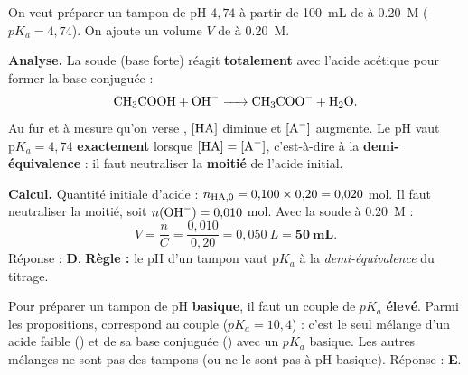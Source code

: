 \documentclass[11pt,a4paper]{article}
\begin{document}
\begin{exemple}
On veut préparer un tampon de pH $4{,}74$ à partir de \SI{100}{mL} de  à \SI{0,20}{M}
($pK_a = 4{,}74$). On ajoute un volume $V$ de  à \SI{0,20}{M}.

\smallskip
\textbf{Analyse.} La soude (base forte) réagit \textbf{totalement} avec l'acide acétique pour former la base
conjuguée  :
\[ \ce{CH3COOH + OH- -> CH3COO- + H2O}. \]
Au fur et à mesure qu'on verse , $[\ce{HA}]$ diminue et $[\ce{A-}]$ augmente. Le pH vaut
$\mathrm{p}K_a = 4{,}74$ \textbf{exactement} lorsque $[\ce{HA}] = [\ce{A-}]$, c'est-à-dire à la
\textbf{demi-équivalence} : il faut neutraliser la \textbf{moitié} de l'acide initial.

\textbf{Calcul.} Quantité initiale d'acide : $n_{\ce{HA},0} = 0{,}100 \times 0{,}20 = 0{,}020$ \si{mol}. Il
faut neutraliser la moitié, soit $n(\ce{OH-}) = 0{,}010$ \si{mol}. Avec la soude à \SI{0,20}{M} :
\[ V = \frac{n}{C} = \frac{0{,}010}{0{,}20} = 0{,}050\ \si{L} = \mathbf{50\ mL}. \]
Réponse : \textbf{D}. \textbf{Règle :} le pH d'un tampon vaut $\mathrm{p}K_a$ à la \emph{demi-équivalence} du titrage.
\end{exemple}

\begin{exemple}
Pour préparer un tampon de pH \textbf{basique}, il faut un couple de $pK_a$ \textbf{élevé}. Parmi les propositions,
 correspond au couple  ($pK_a = 10{,}4$) : c'est le seul mélange d'un
acide faible () et de sa base conjuguée () avec un $pK_a$ basique. Les autres mélanges
ne sont pas des tampons (ou ne le sont pas à pH basique). Réponse : \textbf{E}.
\end{exemple}
\end{document}
